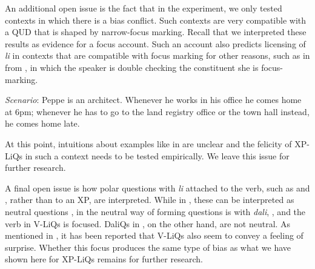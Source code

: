 \documentclass[output=paper,
colorlinks,
citecolor=brown,
newtxmath
]{langscibook}
\begin{document}


An additional open issue is the fact that in the experiment, we only tested contexts in which there is a bias conflict. Such contexts are very compatible with a QUD that is shaped by narrow-focus marking. Recall that we interpreted these results as evidence for a focus account. Such an account also predicts licensing of \textit{li} in contexts that are compatible with focus marking for other reasons, such as in  from \citet{bianchi.bocci.cruschina2016}, in which the speaker is double checking the constituent she is focus-marking.


\eanoraggedright
\textit{Scenario}: Peppe is an architect. Whenever he works in his office he comes home at 6pm; whenever he has to go to the land registry office or the town hall instead, he comes home late.
\begin{xlist}
\end{xlist}\label{doubleask}
\z

\noindent
At this point, intuitions about examples like  in  are unclear and the felicity of XP-LiQs in such a context needs to be tested empirically. We leave this issue for further research.

A final open issue is how polar questions with \textit{li} attached to the verb, such as  and , rather than to an XP, are interpreted. While in , these can be interpreted as neutral questions \citep{Rudin.Kramer.Billings.Baerman1999, dukova2010}, in  the neutral way of forming questions is with \textit{dali}, , and the verb in V-LiQs is focused. DaliQs in , on the other hand, are not neutral. As mentioned in , it has been reported that V-LiQs also seem to convey a feeling of surprise. Whether this focus produces the same type of bias as what we have shown here for XP-LiQs remains for further research.
\end{document}
